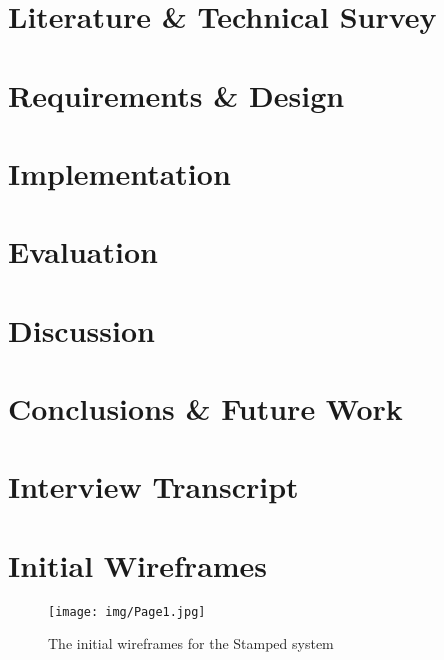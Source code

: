 \documentclass[11pt,openright,a4paper]{report}
\begin{document}
\chapter{Literature \& Technical Survey}


\chapter{Requirements \& Design}



\chapter{Implementation}


\chapter{Evaluation}


\chapter{Discussion}


\chapter{Conclusions \& Future Work}






\appendix


\chapter{Interview Transcript}

\chapter{Initial Wireframes}
\begin{figure}[H]
 \centering
  \texttt{[image: img/Page1.jpg]}
     \caption{The initial wireframes for the Stamped system}
\end{figure}
\end{document}
